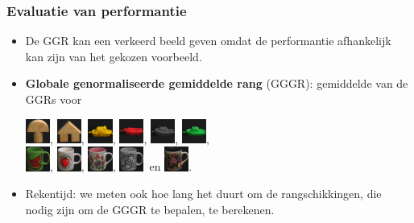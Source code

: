 \documentclass[dutch]{beamer}
\theoremstyle{definition}
\theoremstyle{remark}
\theoremstyle{example}
\begin{document}
\frame
{
  \frametitle{Evaluatie van performantie}

  \begin{itemize}
  \item De GGR kan een verkeerd beeld geven omdat de performantie afhankelijk
  kan zijn van het gekozen voorbeeld. 
  \item \textbf{Globale genormaliseerde gemiddelde rang} (GGGR): gemiddelde van
  de GGRs voor
  \begin{center}
  \vspace{5pt}
  \includegraphics[width=0.8cm]{coil/beeld-0.eps}, 
  \includegraphics[width=0.8cm]{coil/beeld-42.eps}, 
  \includegraphics[width=0.8cm]{coil/beeld-12.eps}, 
  \includegraphics[width=0.8cm]{coil/beeld-18.eps}, 
  \includegraphics[width=0.8cm]{coil/beeld-24.eps}, 
  \includegraphics[width=0.8cm]{coil/beeld-54.eps},\\
  \vspace{5pt}
  \includegraphics[width=0.8cm]{coil/beeld-30.eps}, 
  \includegraphics[width=0.8cm]{coil/beeld-36.eps}, 
  \includegraphics[width=0.8cm]{coil/beeld-6.eps}, 
  \includegraphics[width=0.8cm]{coil/beeld-48.eps}\ en  
  \includegraphics[width=0.8cm]{coil/beeld-60.eps}. 
  \end{center}
  \item Rekentijd: we meten ook hoe lang het duurt om de rangschikkingen, 
  die nodig zijn om de GGGR te bepalen, te berekenen.
  \end{itemize}
}
\end{document}
